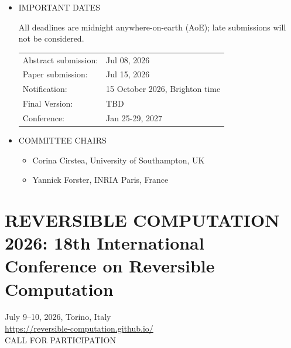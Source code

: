 \documentclass[prodmode,acmtecs]{acmsmall} %
\begin{document}
\begin{itemize}
\item  IMPORTANT DATES 
 
  All deadlines are midnight anywhere-on-earth (AoE); late submissions will not be considered. 
 
\begin{tabulary}{\linewidth}{LL}Abstract submission:  & Jul 08, 2026 \\
Paper submission:  & Jul 15, 2026 \\
Notification:  & 15 October 2026, Brighton time \\
Final Version:  & TBD \\
Conference:  & Jan 25-29, 2027 \\
\end{tabulary}
 
\item  COMMITTEE CHAIRS  
 
\begin{itemize}\item  Corina Cirstea, University of Southampton, UK
\item  Yannick Forster, INRIA Paris, France
\end{itemize} 
\end{itemize}\section{REVERSIBLE COMPUTATION 2026: 18th International Conference on Reversible Computation}\label{REVERSIBLECOMPUTATION2026}  July 9–10, 2026, Torino, Italy\\ 
  \href{https://reversible-computation.github.io/}{https://reversible-computation.github.io/}\\ 
CALL FOR PARTICIPATION 
\end{document}
